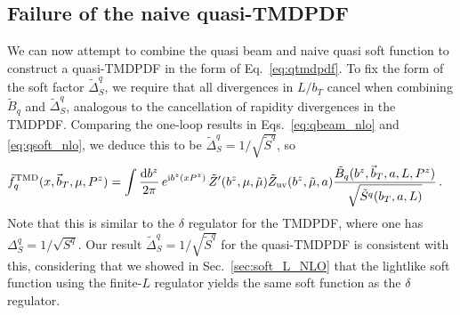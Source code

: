 \documentclass[11pt,a4paper]{article}
\DeclareRobustCommand{\eq}[1]{Eq.~\eqref{eq:#1}}
\DeclareRobustCommand{\eqs}[2]{Eqs.~\eqref{eq:#1} and \eqref{eq:#2}}
\DeclareRobustCommand{\sec}[1]{Sec.~\ref{sec:#1}}
\newcommand{\df}{\mathrm{d}}
\newcommand{\img}{\mathrm{i}}
\newcommand\TMD{\mathrm{TMD}}
\newcommand{\bt}{\vec b_T}
\begin{document}
\subsection{Failure of the naive quasi-TMDPDF}
\label{sec:qtmd_nlo}
We can now attempt to combine the quasi beam and naive quasi soft function to construct a quasi-TMDPDF in the form of \eq{qtmdpdf}.
To fix the form of the soft factor $\tilde\Delta_S^q$, we require that all divergences in $L/b_T$ cancel when combining $\tilde B_q$ and $\tilde\Delta_S^q$, analogous to the cancellation of rapidity divergences in the TMDPDF.
Comparing the one-loop results in \eqs{qbeam_nlo}{qsoft_nlo},
we deduce this to be $\tilde\Delta_S^q = 1/\sqrt{\tilde S^q}$, so
\begin{align} \label{eq:qtmdpdf2}
 \tilde f_{q}^\TMD(x, \bt,\mu,P^z) = \int \frac{\df b^z}{2\pi} \, e^{\img b^z (x P^z)}\,
 &\tilde Z'(b^z,\mu,\tilde \mu) \tilde Z_{\rm uv}(b^z,\tilde \mu, a)
 \frac{\tilde B_{q}(b^z, \bt, a, L, P^z)}{\sqrt{\tilde S^q(b_T, a, L)}}
\,.\end{align}
Note that this is similar to the $\delta$ regulator for the TMDPDF, where one has $\Delta_S^q = 1/\sqrt{S^q}$.
Our result $\tilde\Delta_S^q = 1/\sqrt{\tilde S^q}$ for the quasi-TMDPDF is consistent with this, considering that we showed in \sec{soft_L_NLO} that the lightlike soft function using the finite-$L$ regulator yields the same soft function as the $\delta$ regulator.
\end{document}
